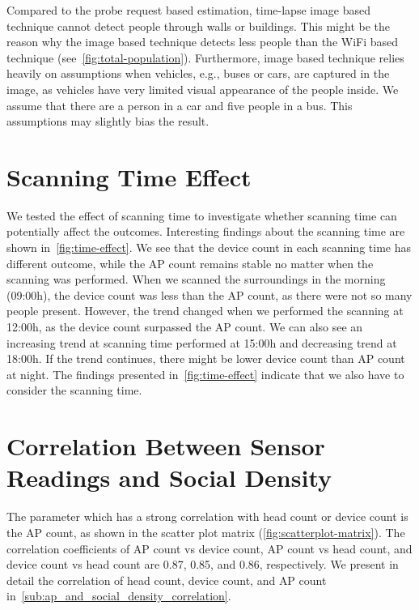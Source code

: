 Compared to the probe request based estimation, time-lapse image based technique cannot detect people through walls or buildings. This might be the reason why the image based technique detects less people than the WiFi based technique (see~\autoref{fig:total-population}). Furthermore, image based technique relies heavily on assumptions when vehicles, e.g., buses or cars, are captured in the image, as vehicles have very limited visual appearance of the people inside. We assume that there are a person in a car and five people in a bus. This assumptions may slightly bias the result.

\section{Scanning Time Effect} %
\label{sec:scanning_time_effect}
We tested the effect of scanning time to investigate whether scanning time can potentially affect the outcomes. Interesting findings about the scanning time are shown in~\autoref{fig:time-effect}. We see that the device count in each scanning time has different outcome, while the \ac{AP} count remains stable no matter when the scanning was performed. When we scanned the surroundings in the morning (09:00h), the device count was less than the \ac{AP} count, as there were not so many people present. However, the trend changed when we performed the scanning at 12:00h, as the device count surpassed the \ac{AP} count. We can also see an increasing trend at scanning time performed at 15:00h and decreasing trend at 18:00h.
If the trend continues, there might be lower device count than \ac{AP} count at night.
The findings presented in~\autoref{fig:time-effect} indicate that we also have to consider the scanning time.

\section{Correlation Between Sensor Readings and Social Density} %
\label{sec:correlation_between_sensor_readings_and_social_density}
The parameter which has a strong correlation with head count or device count is the \ac{AP} count, as shown in the scatter plot matrix (\autoref{fig:scatterplot-matrix}). The correlation coefficients of \ac{AP} count vs device count, \ac{AP} count vs head count, and device count vs head count are 0.87, 0.85, and 0.86, respectively. We present in detail the correlation of head count, device count, and \ac{AP} count in~\autoref{sub:ap_and_social_density_correlation}.

